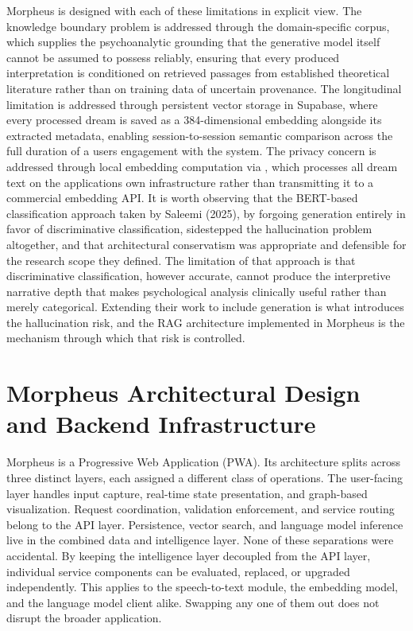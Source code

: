 \documentclass[12pt,a4paper]{report}
\DeclareRobustCommand{\code}[1]{\texttt{\detokenize{#1}}}
\begin{document}
Morpheus is designed with each of these limitations in explicit view. The knowledge boundary problem is addressed through the domain-specific \code{books} corpus, which supplies the psychoanalytic grounding that the generative model itself cannot be assumed to possess reliably, ensuring that every produced interpretation is conditioned on retrieved passages from established theoretical literature rather than on training data of uncertain provenance. The longitudinal limitation is addressed through persistent vector storage in Supabase, where every processed dream is saved as a \num{384}-dimensional embedding alongside its extracted metadata, enabling session-to-session semantic comparison across the full duration of a user\textquotesingle{}s engagement with the system. The privacy concern is addressed through local embedding computation via \code{sentence-transformers}, which processes all dream text on the application\textquotesingle{}s own infrastructure rather than transmitting it to a commercial embedding API. It is worth observing that the BERT-based classification approach taken by Saleemi (2025), by forgoing generation entirely in favor of discriminative classification, sidestepped the hallucination problem altogether, and that architectural conservatism was appropriate and defensible for the research scope they defined. The limitation of that approach is that discriminative classification, however accurate, cannot produce the interpretive narrative depth that makes psychological analysis clinically useful rather than merely categorical. Extending their work to include generation is what introduces the hallucination risk, and the RAG architecture implemented in Morpheus is the mechanism through which that risk is controlled.

\section{Morpheus Architectural Design and Backend Infrastructure}
Morpheus is a Progressive Web Application (PWA). Its architecture splits across three distinct layers, each assigned a different class of operations. The user-facing layer handles input capture, real-time state presentation, and graph-based visualization. Request coordination, validation enforcement, and service routing belong to the API layer. Persistence, vector search, and language model inference live in the combined data and intelligence layer. None of these separations were accidental. By keeping the intelligence layer decoupled from the API layer, individual service components can be evaluated, replaced, or upgraded independently. This applies to the speech-to-text module, the embedding model, and the language model client alike. Swapping any one of them out does not disrupt the broader application.
\end{document}

